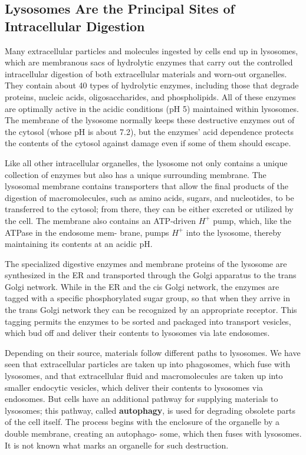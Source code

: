 \subsection{Lysosomes Are the Principal Sites of Intracellular Digestion}

Many extracellular particles and molecules ingested by cells end up in
lysosomes, which are membranous sacs of hydrolytic enzymes that
carry out the controlled intracellular digestion of both extracellular
materials and worn-out organelles. They contain about 40 types of
hydrolytic enzymes, including those that degrade proteins, nucleic acids,
oligosaccharides, and phospholipids. All of these enzymes are optimally
active in the acidic conditions (pH 5) maintained within lysosomes.
The membrane of the lysosome normally keeps these destructive enzymes
out of the cytosol (whose pH is about 7.2), but the enzymes’ acid dependence 
protects the contents of the cytosol against damage even if some of
them should escape.

Like all other intracellular organelles, the lysosome not only contains a
unique collection of enzymes but also has a unique surrounding membrane. 
The lysosomal membrane contains transporters that allow the
final products of the digestion of macromolecules, such as amino acids,
sugars, and nucleotides, to be transferred to the cytosol; from there, they
can be either excreted or utilized by the cell. The membrane also contains
an ATP-driven $H^+$ pump, which, like the ATPase in the endosome mem-
brane, pumps $H^+$ into the lysosome, thereby maintaining its contents at
an acidic pH.

The specialized digestive enzymes and membrane proteins of the lysosome 
are synthesized in the ER and transported through the Golgi
apparatus to the trans Golgi network. While in the ER and the cis Golgi
network, the enzymes are tagged with a specific phosphorylated sugar
group, so that when they arrive in the trans Golgi
network they can be recognized by an appropriate receptor. 
This tagging permits the enzymes to be sorted and
packaged into transport vesicles, which bud off and deliver their contents
to lysosomes via late endosomes.

Depending on their source, materials follow different paths to lysosomes.
We have seen that extracellular particles are taken up into phagosomes,
which fuse with lysosomes, and that extracellular fluid and macromolecules 
are taken up into smaller endocytic vesicles, which deliver their
contents to lysosomes via endosomes. But cells have an additional pathway 
for supplying materials to lysosomes; this pathway, called \textbf{autophagy},
is used for degrading obsolete parts of the cell itself. The process begins with the
enclosure of the organelle by a double membrane, creating an autophago-
some, which then fuses with lysosomes. It is not known
what marks an organelle for such destruction.

